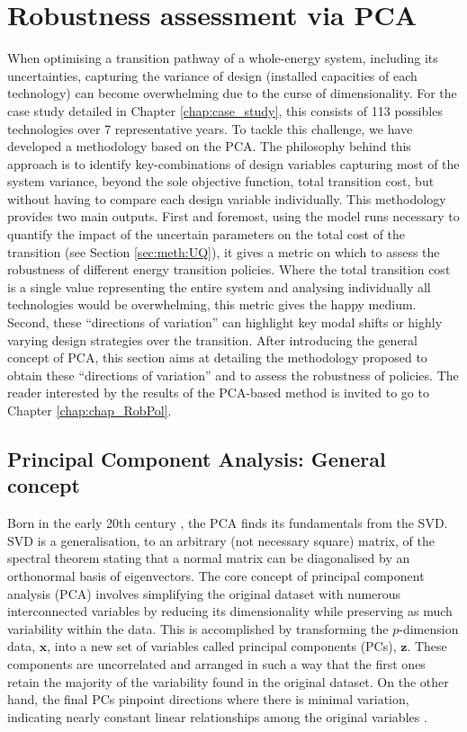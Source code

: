 \section{Robustness assessment via PCA}
\label{sec:meth:PCA}
When optimising a transition pathway of a whole-energy system, including its uncertainties, capturing the variance of design (\ie installed capacities of each technology) can become overwhelming due to the curse of dimensionality. For the case study detailed in Chapter \ref{chap:case_study}, this consists of 113 possibles technologies over 7 representative years. To tackle this challenge, we have developed a methodology based on the \acrfull{PCA}. The philosophy behind this approach is to identify key-combinations of design variables capturing most of the system variance, beyond the sole objective function, \ie total transition cost, but without having to compare each design variable individually. This methodology provides two main outputs. First and foremost, using the model runs necessary to quantify the impact of the uncertain parameters on the total cost of the transition (see Section \ref{sec:meth:UQ}), it gives a metric on which to assess the robustness of different energy transition policies. Where the total transition cost is a single value representing the entire system and analysing individually all technologies would be overwhelming, this metric gives the happy medium. Second, these ``directions of variation'' can highlight key modal shifts or highly varying design strategies over the transition. After introducing the general concept of \gls{PCA}, this section aims at detailing the methodology proposed to obtain these ``directions of variation'' and to assess the robustness of policies. The reader interested by the results of the \gls{PCA}-based method is invited to go to Chapter \ref{chap:chap_RobPol}.

\subsection{Principal Component Analysis: General concept}
\label{subsec:meth:PCA:PCA}
Born in the early 20th century \cite{pearson1901on,hotelling1933analysis}, the \acrfull{PCA} finds its fundamentals from the \gls{SVD}. \gls{SVD} is a generalisation, to an arbitrary (\ie not necessary square) matrix, of the spectral theorem stating that a normal matrix can be diagonalised by an orthonormal basis of eigenvectors.  The core concept of principal component analysis (PCA) involves simplifying the original dataset with numerous interconnected variables by reducing its dimensionality while preserving as much variability within the data. This is accomplished by transforming the $p$-dimension data, $\mathbf{x}$, into a new set of variables called principal components (PCs), $\mathbf{z}$. These components are uncorrelated and arranged in such a way that the first ones retain the majority of the variability found in the original dataset. On the other hand, the final PCs pinpoint directions where there is minimal variation, indicating nearly constant linear relationships among the original variables \cite{jolliffe2002principal}. 

